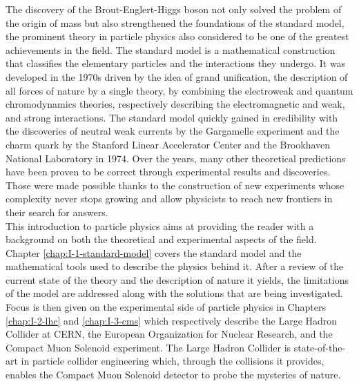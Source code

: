 The discovery of the Brout-Englert-Higgs boson not only solved the problem of the origin of mass but also strengthened the foundations of the standard model, the prominent theory in particle physics also considered to be one of the greatest achievements in the field. The standard model is a mathematical construction that classifies the elementary particles and the interactions they undergo. It was developed in the 1970s driven by the idea of grand unification, the description of all forces of nature by a single theory, by combining the electroweak and quantum chromodynamics theories, respectively describing the electromagnetic and weak, and strong interactions. The standard model quickly gained in credibility with the discoveries of neutral weak currents by the Gargamelle experiment and the charm quark by the Stanford Linear Accelerator Center and the Brookhaven National Laboratory in 1974. Over the years, many other theoretical predictions have been proven to be correct through experimental results and discoveries. Those were made possible thanks to the construction of new experiments whose complexity never stops growing and allow physicists to reach new frontiers in their search for answers. \\

This introduction to particle physics aims at providing the reader with a background on both the theoretical and experimental aspects of the field. Chapter \ref{chap:I-1-standard-model} covers the standard model and the mathematical tools used to describe the physics behind it. After a review of the current state of the theory and the description of nature it yields, the limitations of the model are addressed along with the solutions that are being investigated. Focus is then given on the experimental side of particle physics in Chapters \ref{chap:I-2-lhc} and \ref{chap:I-3-cms} which respectively describe the Large Hadron Collider at CERN, the European Organization for Nuclear Research, and the Compact Muon Solenoid experiment. The Large Hadron Collider is state-of-the-art in particle collider engineering which, through the collisions it provides, enables the Compact Muon Solenoid detector to probe the mysteries of nature.
